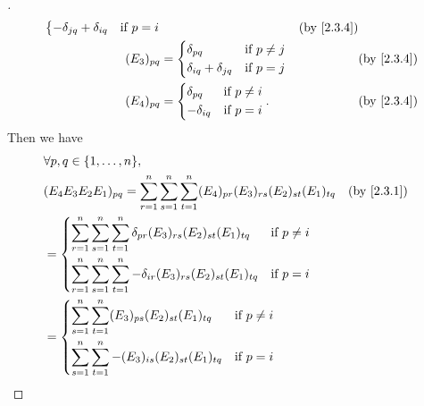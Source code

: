 \begin{proof}[]
\begin{align*}
\begin{dcases}
                                                      -\delta_{j q} + \delta_{i q} & \text{if } p = i
                                                    \end{dcases}    &  & \text{(by \cref{2.3.4})}            \\
    (E_3)_{p q}                                 & = \begin{dcases}
                                                      \delta_{p q}                & \text{if } p \neq j \\
                                                      \delta_{i q} + \delta_{j q} & \text{if } p = j
                                                    \end{dcases}     &  & \text{(by \cref{2.3.4})}             \\
    (E_4)_{p q}                                 & = \begin{dcases}
                                                      \delta_{p q}  & \text{if } p \neq i \\
                                                      -\delta_{i q} & \text{if } p = i
                                                    \end{dcases}.                   &  & \text{(by \cref{2.3.4})}
  \end{align*}
  Then we have
  \begin{align*}
     & \forall p, q \in \set{1, \dots, n},                                                                                                                           \\
     & (E_4 E_3 E_2 E_1)_{p q} = \sum_{r = 1}^n \sum_{s = 1}^n \sum_{t = 1}^n (E_4)_{p r} (E_3)_{r s} (E_2)_{s t} (E_1)_{t q}          &  & \text{(by \cref{2.3.1})} \\
     & = \begin{dcases}
           \sum_{r = 1}^n \sum_{s = 1}^n \sum_{t = 1}^n \delta_{p r} (E_3)_{r s} (E_2)_{s t} (E_1)_{t q}  & \text{if } p \neq i \\
           \sum_{r = 1}^n \sum_{s = 1}^n \sum_{t = 1}^n -\delta_{i r} (E_3)_{r s} (E_2)_{s t} (E_1)_{t q} & \text{if } p = i
         \end{dcases}                                        \\
     & = \begin{dcases}
           \sum_{s = 1}^n \sum_{t = 1}^n (E_3)_{p s} (E_2)_{s t} (E_1)_{t q}  & \text{if } p \neq i \\
           \sum_{s = 1}^n \sum_{t = 1}^n -(E_3)_{i s} (E_2)_{s t} (E_1)_{t q} & \text{if } p = i

\end{dcases}
\end{align*}
\end{proof}
